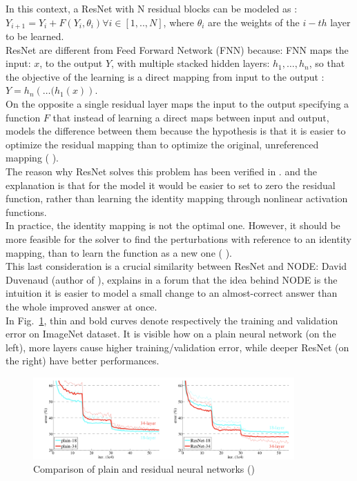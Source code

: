\documentclass[LaM,binding=0.6cm]{sapthesis}
\begin{document}
In this context, a ResNet with N residual blocks can be modeled as : $Y_{i+1} = Y_{i} +F(Y_{i},\theta_{i}) \forall i \in [1,..,N]$, where $\theta_{i}$ are the weights of the $i-th$ layer to be learned.\\ResNet are different from Feed Forward Network (FNN) because: FNN maps the input: $x$, to the output $Y$, with multiple stacked hidden layers: $h_1, \dots, h_n$, so that the objective of the learning is a direct mapping from input to the output : $Y=h_n\left(\dots (h_1(x)\right)$.\\On the opposite a single residual layer maps the input to the output specifying a function $F$ that instead of learning a direct maps between input and output, models the difference between them because the hypothesis is that it is easier to optimize the residual mapping than to optimize the original, unreferenced mapping (\cite{DBLP:journals/corr/HeZRS15} ).\\The reason why ResNet solves this problem has been verified in \cite{DBLP:journals/corr/HeZRS15}. and the explanation is that for the model it would be easier to set to zero the residual function, rather than learning the identity mapping through nonlinear activation functions.\\In practice, the identity mapping is not the optimal one. However, it should be more feasible for the solver to find the perturbations with reference to an identity mapping, than to learn the function as a new one (\cite{DBLP:journals/corr/HeZRS15} ).\\This last consideration is a crucial similarity between ResNet and NODE: David Duvenaud (author of \cite{DBLP:journals/corr/abs-1806-07366}), explains in a forum that the idea behind NODE is the intuition it is easier to model a small change to an almost-correct answer than the whole improved answer at once.\\In Fig.~\ref{fig:degprob}, thin and bold curves denote respectively the training and validation error on ImageNet dataset. It is visible how on a plain neural network (on the left), more layers cause higher training/validation error, while deeper ResNet (on the right) have better performances.
\begin{figure}[H]  \centering
    \includegraphics[width=100mm,scale=0.7]{degprob.png}
    \caption{Comparison of plain and residual neural networks (\cite{DBLP:journals/corr/HeZRS15})}
    \label{fig:degprob}
\end{figure}
\end{document}
